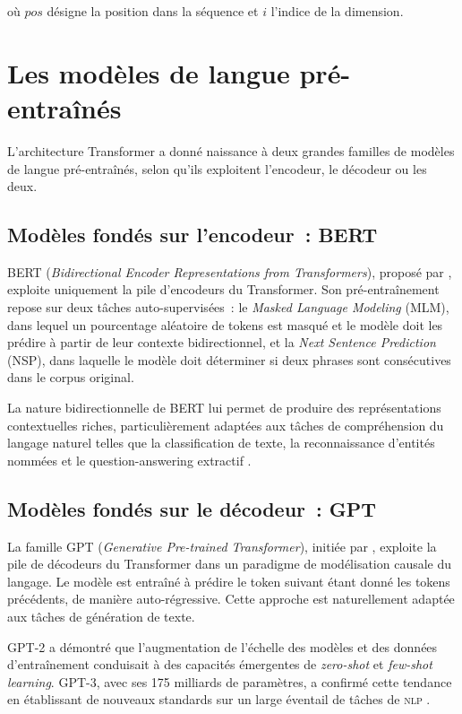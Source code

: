 \documentclass[12pt,a4paper,oneside]{report}
\newcommand{\nlp}{\textsc{nlp}}
\begin{document}
\noindent où $pos$ désigne la position dans la séquence et $i$ l'indice de la dimension.

\section{Les modèles de langue pré-entraînés}

L'architecture Transformer a donné naissance à deux grandes familles de modèles de langue pré-entraînés, selon qu'ils exploitent l'encodeur, le décodeur ou les deux.

\subsection{Modèles fondés sur l'encodeur~: BERT}

BERT (\textit{Bidirectional Encoder Representations from Transformers}), proposé par \citet{devlin2019}, exploite uniquement la pile d'encodeurs du Transformer. Son pré-entraînement repose sur deux tâches auto-supervisées~: le \textit{Masked Language Modeling} (MLM), dans lequel un pourcentage aléatoire de tokens est masqué et le modèle doit les prédire à partir de leur contexte bidirectionnel, et la \textit{Next Sentence Prediction} (NSP), dans laquelle le modèle doit déterminer si deux phrases sont consécutives dans le corpus original.

La nature bidirectionnelle de BERT lui permet de produire des représentations contextuelles riches, particulièrement adaptées aux tâches de compréhension du langage naturel telles que la classification de texte, la reconnaissance d'entités nommées et le question-answering extractif \citep{devlin2019}.

\subsection{Modèles fondés sur le décodeur~: GPT}

La famille GPT (\textit{Generative Pre-trained Transformer}), initiée par \citet{radford2018}, exploite la pile de décodeurs du Transformer dans un paradigme de modélisation causale du langage. Le modèle est entraîné à prédire le token suivant étant donné les tokens précédents, de manière auto-régressive. Cette approche est naturellement adaptée aux tâches de génération de texte.

GPT-2 \citep{radford2019} a démontré que l'augmentation de l'échelle des modèles et des données d'entraînement conduisait à des capacités émergentes de \textit{zero-shot} et \textit{few-shot learning}. GPT-3, avec ses 175 milliards de paramètres, a confirmé cette tendance en établissant de nouveaux standards sur un large éventail de tâches de \nlp{} \citep{brown2020}.
\end{document}
